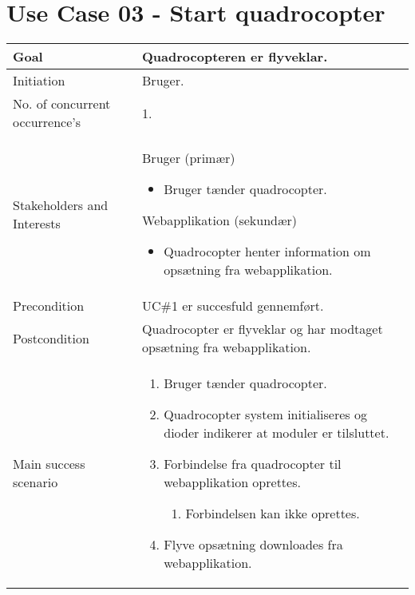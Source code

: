 \section{Use Case 03 - Start quadrocopter}

\begin{table}[H]
\begin{tabular}{|l|p{10cm}|}
\hline

Goal	 								& Quadrocopteren er flyveklar. \\\hline
Initiation 							& Bruger. \\\hline
No. of concurrent occurrence’s		& 1. \\\hline
Stakeholders	and Interests			& Bruger (primær) 
										\begin{itemize}
											\item Bruger tænder quadrocopter.
										\end{itemize} 
									  Webapplikation (sekundær)
										\begin{itemize}
											\item Quadrocopter henter information om opsætning fra webapplikation.
										\end{itemize} \\\hline
Precondition							& UC\#1 er succesfuld gennemført. \\\hline
Postcondition						& Quadrocopter er flyveklar og har modtaget opsætning fra webapplikation. \\\hline
Main success scenario				&
 
									\renewcommand{\labelenumi}{\arabic{enumi}.}
									\renewcommand{\labelenumii}{\Roman{enumii}:}

									\begin{enumerate}[topsep=0.0cm, leftmargin=0.5cm]
										\item Bruger tænder quadrocopter.
										\item Quadrocopter system initialiseres og dioder indikerer at moduler er tilsluttet.
										\item Forbindelse fra quadrocopter til webapplikation oprettes.
											\begin{enumerate}[partopsep=4cm, topsep=0cm, leftmargin=1cm]
												\item Forbindelsen kan ikke oprettes.
											\end{enumerate}
										\item Flyve opsætning downloades fra webapplikation.
									\end{enumerate} \\\hline	


\end{tabular}
\end{table}
